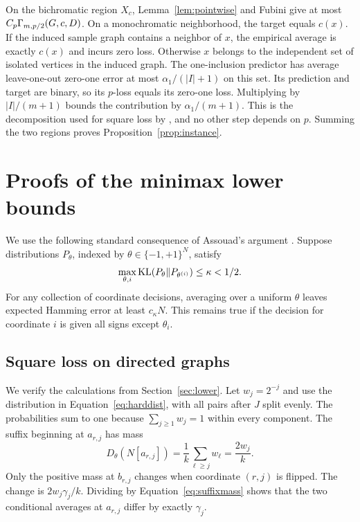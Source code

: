 On the bichromatic region $X_c$, Lemma~\ref{lem:pointwise} and Fubini give at most $C_p\Gamma_{m,p/2}(G,c,D)$. On a monochromatic neighborhood, the target equals $c(x)$. If the induced sample graph contains a neighbor of $x$, the empirical average is exactly $c(x)$ and incurs zero loss. Otherwise $x$ belongs to the independent set of isolated vertices in the induced graph. The one-inclusion predictor has average leave-one-out zero-one error at most $\alpha_1/(|I|+1)$ on this set. Its prediction and target are binary, so its $p$-loss equals its zero-one loss. Multiplying by $|I|/(m+1)$ bounds the contribution by $\alpha_1/(m+1)$. This is the decomposition used for square loss by \citet{bressan2026conditional}, and no other step depends on $p$. Summing the two regions proves Proposition~\ref{prop:instance}.

\section{Proofs of the minimax lower bounds}
\label{app:lower}

We use the following standard consequence of Assouad's argument \citep{tsybakov2009introduction}. Suppose distributions $P_\theta$, indexed by $\theta\in\{-1,+1\}^N$, satisfy
\begin{equation}
\max_{\theta,i}\operatorname{KL}(P_\theta\|P_{\theta^{(i)}})\leq\kappa<1/2. \label{eq:assouad-kl}
\end{equation}
For any collection of coordinate decisions, averaging over a uniform $\theta$ leaves expected Hamming error at least $c_\kappa N$. This remains true if the decision for coordinate $i$ is given all signs except $\theta_i$.

\subsection{Square loss on directed graphs}

We verify the calculations from Section~\ref{sec:lower}. Let $w_j=2^{-j}$ and use the distribution in Equation~\eqref{eq:harddist}, with all pairs after $J$ split evenly. The probabilities sum to one because $\sum_{j\geq1}w_j=1$ within every component. The suffix beginning at $a_{r,j}$ has mass
\begin{equation}
D_\theta(N[a_{r,j}])=\frac1k\sum_{\ell\geq j}w_\ell=\frac{2w_j}{k}. \label{eq:suffixmass}
\end{equation}
Only the positive mass at $b_{r,j}$ changes when coordinate $(r,j)$ is flipped. The change is $2w_j\gamma_j/k$. Dividing by Equation~\eqref{eq:suffixmass} shows that the two conditional averages at $a_{r,j}$ differ by exactly $\gamma_j$.


